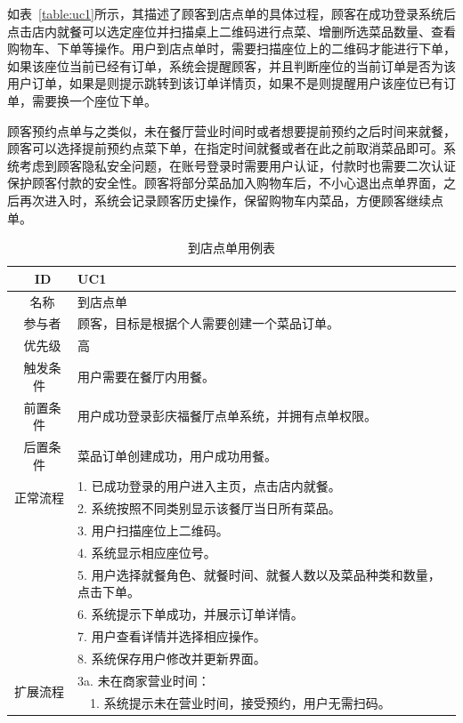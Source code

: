 如表~\ref{table:uc1}所示，其描述了顾客到店点单的具体过程，顾客在成功登录系统后点击店内就餐可以选定座位并扫描桌上二维码进行点菜、增删所选菜品数量、查看购物车、下单等操作。用户到店点单时，需要扫描座位上的二维码才能进行下单，如果该座位当前已经有订单，系统会提醒顾客，并且判断座位的当前订单是否为该用户订单，如果是则提示跳转到该订单详情页，如果不是则提醒用户该座位已有订单，需要换一个座位下单。

顾客预约点单与之类似，未在餐厅营业时间时或者想要提前预约之后时间来就餐，顾客可以选择提前预约点菜下单，在指定时间就餐或者在此之前取消菜品即可。系统考虑到顾客隐私安全问题，在账号登录时需要用户认证，付款时也需要二次认证保护顾客付款的安全性。顾客将部分菜品加入购物车后，不小心退出点单界面，之后再次进入时，系统会记录顾客历史操作，保留购物车内菜品，方便顾客继续点单。

\begin{table}[htbp!]
  \footnotesize
  \centering
  \caption{到店点单用例表}
  \vspace{2mm}
  \begin{tabular}{cp{11.5cm}}
   \hline
   \ ID & UC1 \\ 
   \hline
   \ 名称 & 到店点单 \\ 
   \hline
   \ 参与者 & 顾客，目标是根据个人需要创建一个菜品订单。 \\ 
   \hline
   \ 优先级 & 高 \\ 
   \hline
   \ 触发条件 & 用户需要在餐厅内用餐。 \\ 
   \hline
   \ 前置条件 & 用户成功登录彭庆福餐厅点单系统，并拥有点单权限。 \\ 
   \hline
   \ 后置条件 & 菜品订单创建成功，用户成功用餐。 \\ 
   \hline
   \multirow{2}{*}{正常流程}
    & 1.	已成功登录的用户进入主页，点击店内就餐。\\
    & 2.	系统按照不同类别显示该餐厅当日所有菜品。\\
    & 3.	用户扫描座位上二维码。\\
    & 4.	系统显示相应座位号。\\
    & 5.	用户选择就餐角色、就餐时间、就餐人数以及菜品种类和数量，点击下单。\\
    & 6.	系统提示下单成功，并展示订单详情。\\
    & 7.	用户查看详情并选择相应操作。\\
    & 8.  系统保存用户修改并更新界面。 \\
   \hline
   \multirow{2}{*}{扩展流程}
    & 3a. 未在商家营业时间：\\
    & ~~1.	系统提示未在营业时间，接受预约，用户无需扫码。\\

\end{tabular}
\end{table}
